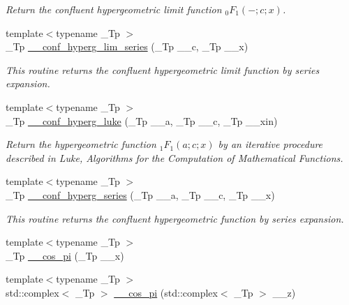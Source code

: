\begin{DoxyCompactItemize}
\begin{DoxyCompactList}\small\item\em Return the confluent hypergeometric limit function $ {}_0F_1(-;c;x) $. \end{DoxyCompactList}\item 
{\footnotesize template$<$typename \+\_\+\+Tp $>$ }\\\+\_\+\+Tp \hyperlink{namespacestd_1_1____detail_a44b73ec79e0a8cfd1f29a21cb39f2bdc}{\+\_\+\+\_\+conf\+\_\+hyperg\+\_\+lim\+\_\+series} (\+\_\+\+Tp \+\_\+\+\_\+c, \+\_\+\+Tp \+\_\+\+\_\+x)
\begin{DoxyCompactList}\small\item\em This routine returns the confluent hypergeometric limit function by series expansion. \end{DoxyCompactList}\item 
{\footnotesize template$<$typename \+\_\+\+Tp $>$ }\\\+\_\+\+Tp \hyperlink{namespacestd_1_1____detail_ac3b4c72998f9d7deb6d79bda93220e58}{\+\_\+\+\_\+conf\+\_\+hyperg\+\_\+luke} (\+\_\+\+Tp \+\_\+\+\_\+a, \+\_\+\+Tp \+\_\+\+\_\+c, \+\_\+\+Tp \+\_\+\+\_\+xin)
\begin{DoxyCompactList}\small\item\em Return the hypergeometric function $ {}_1F_1(a;c;x) $ by an iterative procedure described in Luke, Algorithms for the Computation of Mathematical Functions. \end{DoxyCompactList}\item 
{\footnotesize template$<$typename \+\_\+\+Tp $>$ }\\\+\_\+\+Tp \hyperlink{namespacestd_1_1____detail_a5f701a63e17238132405dd209660fc1d}{\+\_\+\+\_\+conf\+\_\+hyperg\+\_\+series} (\+\_\+\+Tp \+\_\+\+\_\+a, \+\_\+\+Tp \+\_\+\+\_\+c, \+\_\+\+Tp \+\_\+\+\_\+x)
\begin{DoxyCompactList}\small\item\em This routine returns the confluent hypergeometric function by series expansion. \end{DoxyCompactList}\item 
{\footnotesize template$<$typename \+\_\+\+Tp $>$ }\\\+\_\+\+Tp \hyperlink{namespacestd_1_1____detail_abfdaa500e1321747a0ad391ca3416a0b}{\+\_\+\+\_\+cos\+\_\+pi} (\+\_\+\+Tp \+\_\+\+\_\+x)
\item 
{\footnotesize template$<$typename \+\_\+\+Tp $>$ }\\std\+::complex$<$ \+\_\+\+Tp $>$ \hyperlink{namespacestd_1_1____detail_a0332c7fb29ed7be543103adc8d04d39d}{\+\_\+\+\_\+cos\+\_\+pi} (std\+::complex$<$ \+\_\+\+Tp $>$ \+\_\+\+\_\+z)

\end{DoxyCompactItemize}
